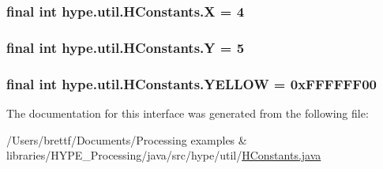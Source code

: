 \hypertarget{interfacehype_1_1util_1_1_h_constants_aad002b8922a9db0a55d3a88b77068354}{
\subsubsection[{X}]{\setlength{\rightskip}{0pt plus 5cm}final int hype.\-util.\-H\-Constants.\-X = 4\hspace{0.3cm}{\ttfamily [static]}}}\label{interfacehype_1_1util_1_1_h_constants_aad002b8922a9db0a55d3a88b77068354}
\hypertarget{interfacehype_1_1util_1_1_h_constants_aeb289bdf5e7b1285c682c96d5efa4216}{
\subsubsection[{Y}]{\setlength{\rightskip}{0pt plus 5cm}final int hype.\-util.\-H\-Constants.\-Y = 5\hspace{0.3cm}{\ttfamily [static]}}}\label{interfacehype_1_1util_1_1_h_constants_aeb289bdf5e7b1285c682c96d5efa4216}
\hypertarget{interfacehype_1_1util_1_1_h_constants_afcc8e6a8df20855af26d4102a4676e93}{
\subsubsection[{Y\-E\-L\-L\-O\-W}]{\setlength{\rightskip}{0pt plus 5cm}final int hype.\-util.\-H\-Constants.\-Y\-E\-L\-L\-O\-W = 0x\-F\-F\-F\-F\-F\-F00\hspace{0.3cm}{\ttfamily [static]}}}\label{interfacehype_1_1util_1_1_h_constants_afcc8e6a8df20855af26d4102a4676e93}


The documentation for this interface was generated from the following file\-:\begin{DoxyCompactItemize}
\item 
/\-Users/brettf/\-Documents/\-Processing examples \& libraries/\-H\-Y\-P\-E\-\_\-\-Processing/java/src/hype/util/\hyperlink{_h_constants_8java}{H\-Constants.\-java}\end{DoxyCompactItemize}
